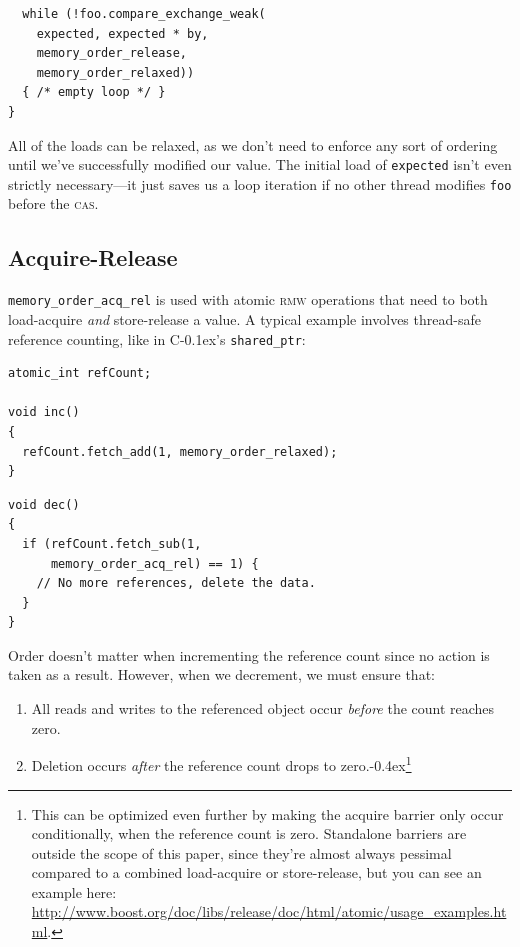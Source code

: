 \documentclass[fontsize=10pt, numbers=endperiod]{scrartcl}
\newcommand{\codesize}{\fontsize{10pt}{12pt}}
\newcommand{\punckern}{\kern-0.4ex}
\newcommand{\cpp}[1]{C\kern-0.1ex\raisebox{0.15ex}{\texttt{++}}{\addfontfeature{Numbers=LowercaseOff}#1}}
\newenvironment{colfigure}
  {\par\vspace{1\baselineskip minus 0.5\baselineskip}\noindent\minipage{\linewidth}}
  {\endminipage\vspace*{1\baselineskip minus 0.7\baselineskip}}
\begin{document}
\begin{multicols*}{2}
\begin{colfigure}
\begin{verbatim}
  while (!foo.compare_exchange_weak(
    expected, expected * by,
    memory_order_release,
    memory_order_relaxed))
  { /* empty loop */ }
}
\end{verbatim}
\end{colfigure}
All of the loads can be relaxed, as we don't need to enforce any sort of ordering
until we've successfully modified our value.
The initial load of \texttt{expected} isn't even strictly necessary---it just
saves us a loop iteration if no other thread modifies \texttt{foo} before the
\textsc{cas}.

\subsection{Acquire-Release}

\texttt{memory\_order\_acq\_rel} is used with atomic \textsc{rmw} operations
that need to both load-acquire \emph{and} store-release a value.
A typical example involves thread-safe reference counting,
like in \cpp{}'s \texttt{shared_ptr}:
\begin{colfigure}
\begin{verbatim}
atomic_int refCount;

void inc()
{
  refCount.fetch_add(1, memory_order_relaxed);
}
\end{verbatim}
\end{colfigure}
\begin{colfigure}
\begin{verbatim}
void dec()
{
  if (refCount.fetch_sub(1,
      memory_order_acq_rel) == 1) {
    // No more references, delete the data.
  }
}
\end{verbatim}
\end{colfigure}

Order doesn't matter when incrementing the reference
count since no action is taken as a result.
However, when we decrement, we must ensure that:
\begin{enumerate}
\item All reads and writes to the referenced object occur
\emph{before} the count reaches zero.
\item Deletion occurs \emph{after} the reference count drops to
    zero.\punckern\footnote{This can be optimized even further by
    making the acquire barrier only occur conditionally, when the reference
    count is zero.
    Standalone barriers are outside the scope of this paper,
    since they're almost always pessimal compared to a combined load-acquire
    or store-release, but you can see an example here:
    \url{http://www.boost.org/doc/libs/release/doc/html/atomic/usage\_examples.html}.}
\end{enumerate}


\end{multicols*}
\end{document}
